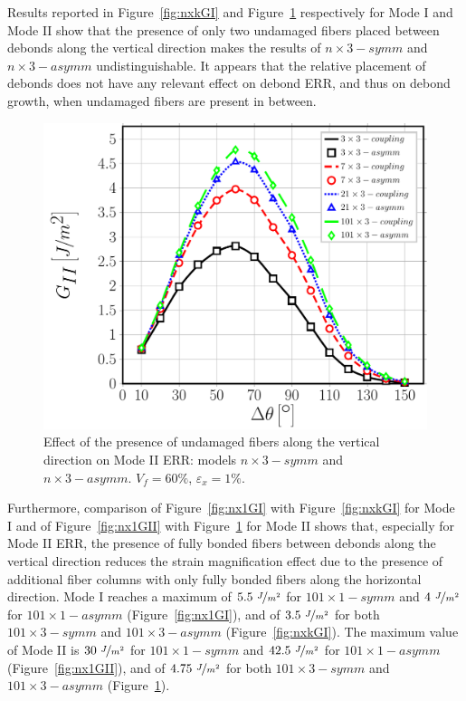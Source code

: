 \documentclass[smallextended]{svjour3}       %
\begin{document}
Results reported in Figure~\ref{fig:nxkGI} and Figure~\ref{fig:nxkGII} respectively for Mode I and Mode II show that the presence of only two undamaged fibers placed between debonds along the vertical direction makes the results of $n\times 3-symm$ and $n\times 3-asymm$ undistinguishable. It appears that the relative placement of debonds does not have any relevant effect on debond ERR, and thus on debond growth, when undamaged fibers are present in between.

\begin{figure}[!h]
\centering
\includegraphics[width=\textwidth]{nxk-coupling-vf60-GII.pdf}
\caption{Effect of the presence of undamaged fibers along the vertical direction on Mode II ERR: models $n\times 3-symm$ and $n\times 3-asymm$. $V_{f}=60\%$, $\varepsilon_{x}=1\%$.}\label{fig:nxkGII}
\end{figure}

Furthermore, comparison of Figure~\ref{fig:nx1GI} with Figure~\ref{fig:nxkGI} for Mode I and of Figure~\ref{fig:nx1GII} with Figure~\ref{fig:nxkGII} for Mode II shows that, especially for Mode II ERR, the presence of fully bonded fibers between debonds along the vertical direction reduces the strain magnification effect due to the presence of additional fiber columns with only fully bonded fibers along the horizontal direction. Mode I reaches a maximum of $5.5\ \nicefrac{J}{m^{2}}$ for $101\times 1-symm$ and $4\  \nicefrac{J}{m^{2}}$ for $101\times 1-asymm$ (Figure~\ref{fig:nx1GI}), and of $3.5\  \nicefrac{J}{m^{2}}$ for both $101\times 3-symm$ and $101\times 3-asymm$ (Figure~\ref{fig:nxkGI}). The maximum value of Mode II is $30\  \nicefrac{J}{m^{2}}$ for $101\times 1-symm$ and $42.5\  \nicefrac{J}{m^{2}}$ for $101\times 1-asymm$ (Figure~\ref{fig:nx1GII}), and of $4.75\  \nicefrac{J}{m^{2}}$ for both $101\times 3-symm$ and $101\times 3-asymm$ (Figure~\ref{fig:nxkGII}).
\end{document}
